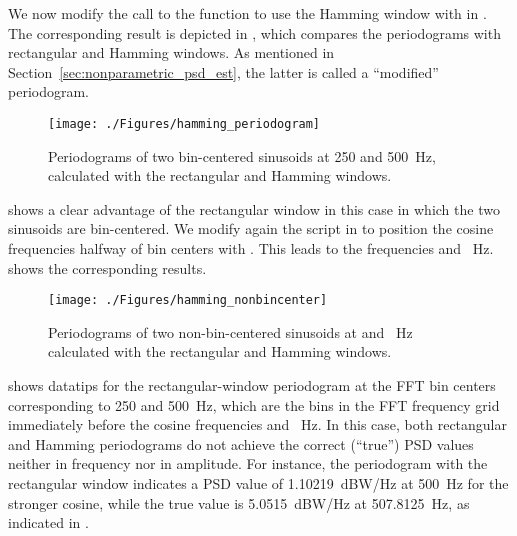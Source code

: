 We now modify the call to the  function to use the Hamming window with  in . The corresponding result is depicted in , which
compares the periodograms with rectangular and Hamming windows. As mentioned in Section~\ref{sec:nonparametric_psd_est}, the latter is called a ``modified'' periodogram.

\begin{figure}[htbp]
\centering
\texttt{[image: ./Figures/hamming\_periodogram]}
\caption{Periodograms of two bin-centered sinusoids at 250 and 500~Hz, calculated with the rectangular and Hamming windows.\label{fig:hamming_periodogram}}
\end{figure}

 shows a clear advantage of the rectangular window in this case in which the
two sinusoids are bin-centered. We modify again the script in  to
position the cosine frequencies halfway of bin centers with
. This leads to the frequencies  and ~Hz.
 shows the corresponding results.

\begin{figure}[htbp]
\centering
\texttt{[image: ./Figures/hamming\_nonbincenter]}
\caption{Periodograms of two non-bin-centered sinusoids at  and ~Hz calculated with the rectangular and Hamming windows.\label{fig:hamming_nonbincenter}}
\end{figure}

 shows datatips for the rectangular-window periodogram at the FFT bin centers corresponding to 250 and 500~Hz, which are the
bins in the FFT frequency grid immediately before the cosine frequencies  and ~Hz. 
In this case, both rectangular and Hamming periodograms do not achieve the correct (``true'') PSD values neither
in frequency nor in amplitude. For instance, the periodogram with the rectangular window indicates a PSD
value of 1.10219~dBW/Hz at 500~Hz for the stronger cosine, while the true value is 5.0515~dBW/Hz at 507.8125~Hz,
as indicated in .
\eExample

